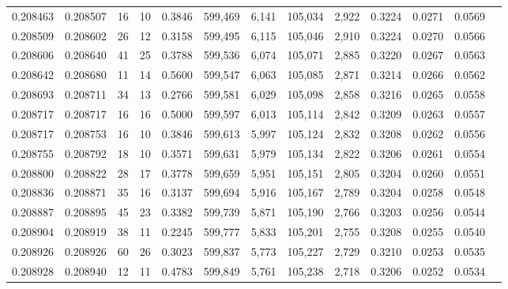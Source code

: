 \begin{tabular}{rrrrrrrrrrrrr}
0.208463 & 0.208507 &    16 &  10 &                                     0.3846 & 599,469 &   6,141 & 105,034 &   2,922 & 0.3224 & 0.0271 & 0.0569 \\
0.208509 & 0.208602 &    26 &  12 &                                     0.3158 & 599,495 &   6,115 & 105,046 &   2,910 & 0.3224 & 0.0270 & 0.0566 \\
0.208606 & 0.208640 &    41 &  25 &                                     0.3788 & 599,536 &   6,074 & 105,071 &   2,885 & 0.3220 & 0.0267 & 0.0563 \\
0.208642 & 0.208680 &    11 &  14 &                                     0.5600 & 599,547 &   6,063 & 105,085 &   2,871 & 0.3214 & 0.0266 & 0.0562 \\
0.208693 & 0.208711 &    34 &  13 &                                     0.2766 & 599,581 &   6,029 & 105,098 &   2,858 & 0.3216 & 0.0265 & 0.0558 \\
0.208717 & 0.208717 &    16 &  16 &                                     0.5000 & 599,597 &   6,013 & 105,114 &   2,842 & 0.3209 & 0.0263 & 0.0557 \\
0.208717 & 0.208753 &    16 &  10 &                                     0.3846 & 599,613 &   5,997 & 105,124 &   2,832 & 0.3208 & 0.0262 & 0.0556 \\
0.208755 & 0.208792 &    18 &  10 &                                     0.3571 & 599,631 &   5,979 & 105,134 &   2,822 & 0.3206 & 0.0261 & 0.0554 \\
0.208800 & 0.208822 &    28 &  17 &                                     0.3778 & 599,659 &   5,951 & 105,151 &   2,805 & 0.3204 & 0.0260 & 0.0551 \\
0.208836 & 0.208871 &    35 &  16 &                                     0.3137 & 599,694 &   5,916 & 105,167 &   2,789 & 0.3204 & 0.0258 & 0.0548 \\
0.208887 & 0.208895 &    45 &  23 &                                     0.3382 & 599,739 &   5,871 & 105,190 &   2,766 & 0.3203 & 0.0256 & 0.0544 \\
0.208904 & 0.208919 &    38 &  11 &                                     0.2245 & 599,777 &   5,833 & 105,201 &   2,755 & 0.3208 & 0.0255 & 0.0540 \\
0.208926 & 0.208926 &    60 &  26 &                                     0.3023 & 599,837 &   5,773 & 105,227 &   2,729 & 0.3210 & 0.0253 & 0.0535 \\
0.208928 & 0.208940 &    12 &  11 &                                     0.4783 & 599,849 &   5,761 & 105,238 &   2,718 & 0.3206 & 0.0252 & 0.0534 \\

\end{tabular}
